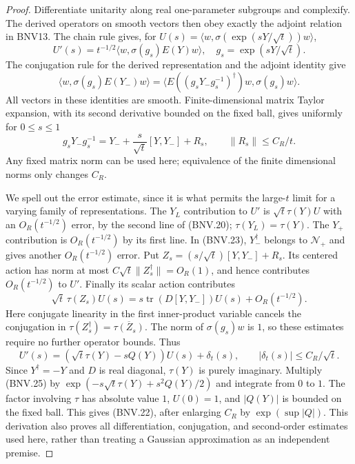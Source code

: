 \begin{proof}
Differentiate unitarity along real one-parameter subgroups and complexify.
The derived operators on smooth vectors then obey exactly the adjoint
relation in BNV13.  The chain rule gives, for
$U(s)=\langle w,\sigma(\exp(sY/\sqrt t))w\rangle$,
\[
 U'(s)=t^{-1/2}\langle w,\sigma(g_s)E(Y)w\rangle,
 \quad g_s=\exp(sY/\sqrt t).
\]
The conjugation rule for the derived representation and the adjoint
identity give
\[
 \langle w,\sigma(g_s)E(Y_-)w\rangle
 =\langle E((g_sY_-g_s^{-1})^\dagger)w,\sigma(g_s)w\rangle.
 \tag{BNV.23}
\]
All vectors in these identities are smooth.  Finite-dimensional matrix
Taylor expansion, with its second derivative bounded on the fixed ball,
gives uniformly for $0\le s\le1$
\[
 g_sY_-g_s^{-1}
   =Y_-+\frac{s}{\sqrt t}[Y,Y_-]+R_s,
 \qquad \|R_s\|\le C_R/t.
 \tag{BNV.24}
\]
Any fixed matrix norm can be used here; equivalence of the finite
dimensional norms only changes $C_R$.

We spell out the error estimate, since it is what permits the large-$t$
limit for a varying family of representations.  The $Y_L$ contribution
to $U'$ is $\sqrt t\tau(Y)U$ with an $O_R(t^{-1/2})$ error, by the
second line of (BNV.20); $\tau(Y_L)=\tau(Y)$.
The $Y_+$ contribution is $O_R(t^{-1/2})$ by its first line.  In
(BNV.23), $Y_-^\dagger$ belongs to $\mathcal N_+$ and gives another
$O_R(t^{-1/2})$ error.  Put $Z_s=(s/\sqrt t)[Y,Y_-]+R_s$.
Its centered action has norm at most
$C\sqrt t\|Z_s^\dagger\|=O_R(1)$, and hence contributes
$O_R(t^{-1/2})$ to $U'$.  Finally its scalar action contributes
\[
 \sqrt t\,\tau(Z_s)U(s)
   =s\operatorname{tr}(D[Y,Y_-])U(s)+O_R(t^{-1/2}).
\]
Here conjugate linearity in the first inner-product variable cancels the
conjugation in $\tau(Z_s^\dagger)=\overline{\tau(Z_s)}$.
The norm of $\sigma(g_s)w$ is $1$, so these estimates require no further
operator bounds.  Thus
\[
 U'(s)=(\sqrt t\tau(Y)-sQ(Y))U(s)+\delta_t(s),
 \qquad |\delta_t(s)|\le C_R/\sqrt t.
 \tag{BNV.25}
\]
Since $Y^\dagger=-Y$ and $D$ is real diagonal, $\tau(Y)$ is purely
imaginary.  Multiply (BNV.25) by
$\exp(-s\sqrt t\tau(Y)+s^2Q(Y)/2)$ and integrate from $0$ to $1$.
The factor involving $\tau$ has absolute value $1$, $U(0)=1$, and
$|Q(Y)|$ is bounded on the fixed ball.  This gives (BNV.22), after
enlarging $C_R$ by $\exp(\sup|Q|)$.  This derivation also proves all
differentiation, conjugation, and second-order estimates used here,
rather than treating a Gaussian approximation as an independent premise.
\end{proof}

